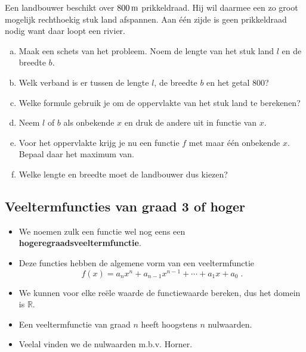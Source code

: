 \documentclass[12pt]{article}
\begin{document}
\begin{oefening}
Een landbouwer beschikt over $800 \m$ prikkeldraad. Hij wil daarmee een zo groot mogelijk rechthoekig stuk land afspannen. Aan één zijde is geen prikkeldraad nodig want daar loopt een rivier.
\begin{enumerate}[(a)]
  \item Maak een schets van het probleem. Noem de lengte van het stuk land $l$ en de breedte $b$.
  \item Welk verband is er tussen de lengte $l$, de breedte $b$ en het getal $800$?
  \item Welke formule gebruik je om de oppervlakte van het stuk land te berekenen?
  \item Neem $l$ of $b$ als onbekende $x$ en druk de andere uit in functie van $x$.
  \item Voor het oppervlakte krijg je nu een functie $f$ met maar één onbekende $x$. Bepaal daar het maximum van.
  \item Welke lengte en breedte moet de landbouwer dus kiezen?
\end{enumerate}
\end{oefening}


\pagebreak
\subsection{Veeltermfuncties van graad 3 of hoger}

\begin{itemize}
\item We noemen zulk een functie wel nog eens een {\bf hogeregraadsveeltermfunctie}.
\item Deze functies hebben de algemene vorm van een veeltermfunctie
  $$f(x)= a_nx^n + a_{n-1}x^{n-1} + \cdots + a_1x + a_0\;.$$
\item We kunnen voor elke reële waarde de functiewaarde bereken, dus het domein is $\mathbb{R}$.
\item Een veeltermfunctie van graad $n$ heeft hoogstens $n$ nulwaarden.
\item Veelal vinden we de nulwaarden m.b.v. Horner.
\end{itemize}
\end{document}
